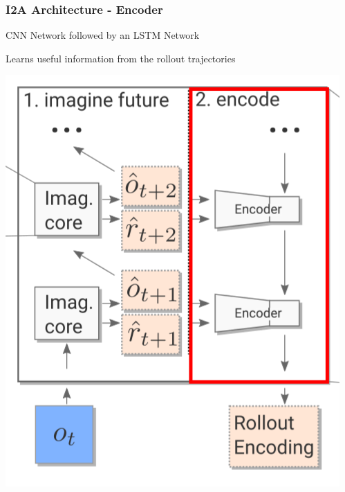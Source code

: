 \begin{frame}
    \frametitle{I2A Architecture - Encoder}

\begin{multicols}{2}
	\begin{PraesentationAufzaehlung}
		\item CNN Network followed by an LSTM Network
		\item Learns useful information from the rollout trajectories
	\end{PraesentationAufzaehlung}
    \vfill\columnbreak
	\begin{center}
    \includegraphics[height=.5\textheight]{./Images/encoder.png}%
	\end{center}
\end{multicols}
    
\end{frame}
\clearpage



